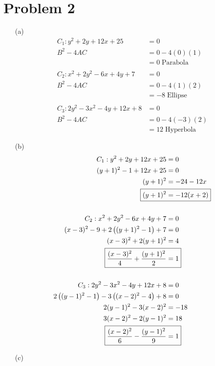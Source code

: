 \documentclass{article}
\begin{document}
\section*{Problem 2}
\begin{itemize}
\item[(a)]
	\begin{align*}
		C_1:y^2+2y+12x+25&=0 \\
		B^2-4AC&=0-4(0)(1) \\
		&=0\;\boxed{\text{Parabola}} \\ \\
		C_2:x^2+2y^2-6x+4y+7&=0 \\
		B^2-4AC&=0-4(1)(2) \\
		&=-8\;\boxed{\text{Ellipse}} \\ \\
		C_3:2y^2-3x^2-4y+12x+8&=0 \\
		B^2-4AC&=0-4(-3)(2) \\
		&=12\;\boxed{\text{Hyperbola}}
	\end{align*}

\item[(b)]
	\begin{align*}
		C_1:y^2+2y+12x+25&=0 \\
		(y+1)^2-1+12x+25&=0 \\
		(y+1)^2&=-24-12x \\
		\Aboxed{(y+1)^2&=-12(x+2)} \\ \\
		C_2:x^2+2y^2-6x+4y+7&=0 \\
		(x-3)^2-9+2\left((y+1)^2-1\right)+7&=0 \\
		(x-3)^2+2(y+1)^2&=4 \\
		\Aboxed{\frac{(x-3)^2}{4}+\frac{(y+1)^2}{2}&=1} \\ \\
		C_3:2y^2-3x^2-4y+12x+8&=0 \\
		2\left((y-1)^2-1\right)-3\left((x-2)^2-4\right)+8&=0 \\
		2(y-1)^2-3(x-2)^2&=-18 \\
		3(x-2)^2-2(y-1)^2&=18 \\
		\Aboxed{\frac{(x-2)^2}{6}-\frac{(y-1)^2}{9}&=1}
	\end{align*}

\item[(c)]
	\phantom{}


\end{itemize}
\end{document}
